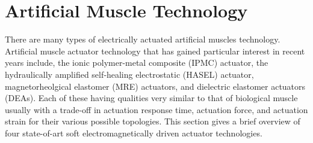 \section{Artificial Muscle Technology}
There are many types of electrically actuated artificial muscles technology. Artificial muscle actuator technology that has gained particular interest in recent years include, the ionic polymer-metal composite (IPMC) actuator, the hydraulically amplified self‐healing electrostatic (HASEL) actuator, magnetorheolgical elastomer (MRE) actuators, and dielectric elastomer actuators (DEAs). Each of these having qualities very similar to that of biological muscle usually with a trade-off in actuation response time, actuation force, and actuation strain for their various possible topologies. This section gives a brief overview of four state-of-art soft electromagnetically driven actuator technologies.

